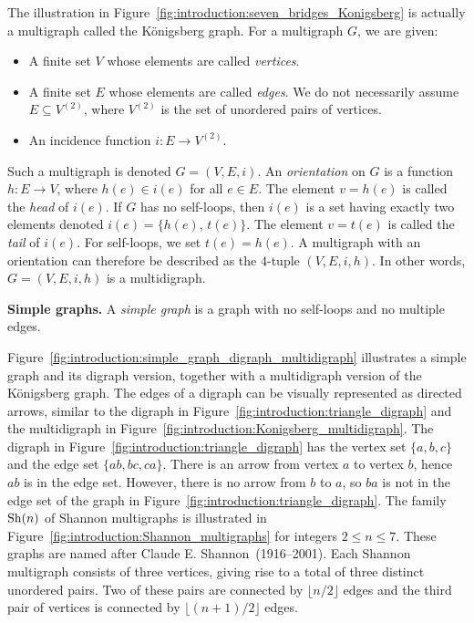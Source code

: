 The illustration in
Figure~\ref{fig:introduction:seven_bridges_Konigsberg} is actually a
multigraph called the K\"onigsberg graph. For a multigraph $G$, we are
given:
%
\begin{itemize}
\item A finite set $V$ whose elements are called \emph{vertices}.

\item A finite set $E$ whose elements are called \emph{edges}. We do
  not necessarily assume $E \subseteq V^{(2)}$, where $V^{(2)}$ is the
  set of unordered pairs of vertices.

\item An incidence function $i: E \longrightarrow V^{(2)}$.
\end{itemize}
%
Such a multigraph is denoted $G = (V,E,i)$. An \emph{orientation} on
$G$ is a function $h: E \longrightarrow V$, where $h(e) \in i(e)$ for
all $e \in E$. The element $v = h(e)$ is called the \emph{head} of
$i(e)$. If $G$ has no self-loops, then $i(e)$ is a set having exactly
two elements denoted $i(e) = \{h(e),\, t(e)\}$. The element $v = t(e)$
is called the \emph{tail} of $i(e)$. For self-loops, we set
$t(e) = h(e)$. A multigraph with an orientation can therefore be
described as the $4$-tuple $(V, E, i, h)$. In other words,
$G = (V,E,i,h)$ is a multidigraph.

\begin{definition}
\textbf{Simple graphs.}
A \emph{simple graph} is a graph with no self-loops and no multiple
edges.
\end{definition}

Figure~\ref{fig:introduction:simple_graph_digraph_multidigraph}
illustrates a simple graph and its digraph version, together with a
multidigraph version of the K\"onigsberg graph. The edges of a digraph
can be visually represented as directed arrows, similar to the digraph
in
Figure~\ref{fig:introduction:triangle_digraph} and the multidigraph in
Figure~\ref{fig:introduction:Konigsberg_multidigraph}. The digraph in
Figure~\ref{fig:introduction:triangle_digraph} has the vertex set
$\{a, b, c\}$ and the edge set $\{ab, bc, ca\}$. There is an arrow
from vertex $a$ to vertex $b$, hence $ab$ is in the edge set. However,
there is no arrow from $b$ to $a$, so $ba$ is not in the edge set of
the graph in Figure~\ref{fig:introduction:triangle_digraph}. The
family $\operatorname*{Sh}(n)$ of Shannon multigraphs is illustrated in
Figure~\ref{fig:introduction:Shannon_multigraphs} for integers
$2 \leq n \leq 7$. These graphs are named after Claude
E. Shannon~(1916--2001). Each Shannon multigraph consists of three
vertices, giving rise to a total of three distinct unordered
pairs. Two of these pairs are connected by $\lfloor n/2 \rfloor$
edges and the third pair of vertices is connected by
$\lfloor (n + 1) / 2 \rfloor$ edges.

